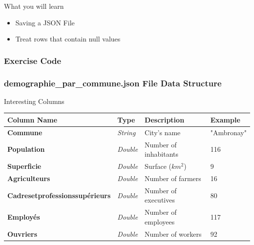 \documentclass[slidetop,9pt,utf8]{beamer}
\begin{document}
\begin{CJK}{UTF8}{gbsn}
\begin{frame}
  \begin{block}{What you will learn}
    \begin{itemize}
      \item Saving a JSON File
      \item Treat rows that contain null values
    \end{itemize}
  \end{block}

\end{frame}

\begin{frame}
  \frametitle{Exercise Code}

  

\end{frame}

\begin{frame}

  \frametitle{demographie\_par\_commune.json File Data Structure}

  \begin{block}{Interesting Columns}
    \begin{tabular}{|l|l|l|l|}
          \hline 
          \rowcolor{gray} \textbf{Column Name} & \textbf{Type} & \textbf{Description} & \textbf{Example} \\ \hline
          \textbf{Commune} & \textit{String} & City's name & "Ambronay" \\ \hline
          \textbf{Population} & \textit{Double} & Number of inhabitants & 116 \\ \hline
          \textbf{Superficie} & \textit{Double} & Surface ($km^{2}$) & 9 \\ \hline
          \textbf{Agriculteurs} & \textit{Double} & Number of farmers & 16 \\ \hline
          \textbf{Cadresetprofessionssupérieurs} & \textit{Double} & Number of executives & 80 \\ \hline
          \textbf{Employés} & \textit{Double} & Number of employees & 117 \\ \hline
          \textbf{Ouvriers} & \textit{Double} & Number of workers & 92 \\ \hline
    \end{tabular}
  \end{block}


\end{frame}
\end{CJK}
\end{document}
